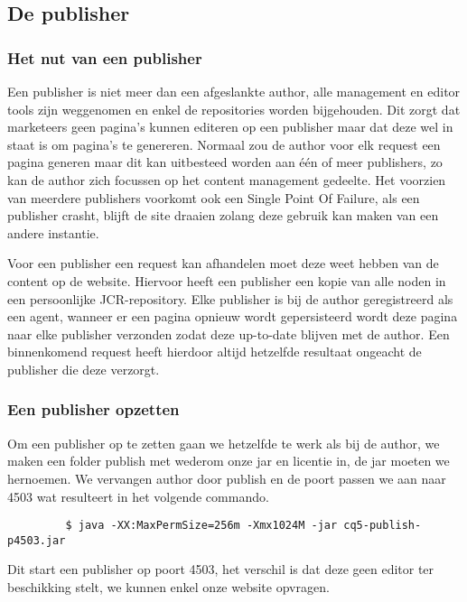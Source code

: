 
	\subsection{De publisher}
	\subsubsection{Het nut van een publisher}
	Een publisher is niet meer dan een afgeslankte author, alle management en editor tools zijn weggenomen en enkel de repositories worden bijgehouden. Dit zorgt dat marketeers geen pagina's kunnen editeren op een publisher maar dat deze wel in staat is om pagina's te genereren. Normaal zou de author voor elk request een pagina generen maar dit kan uitbesteed worden aan één of meer publishers, zo kan de author zich focussen op het content management gedeelte. Het voorzien van meerdere publishers voorkomt ook een \textquotedbl Single Point Of Failure\textquotedbl{}, als een publisher crasht, blijft de site draaien zolang deze gebruik kan maken van een andere instantie.
	\par
	Voor een publisher een request kan afhandelen moet deze weet hebben van de content op de website. Hiervoor heeft een publisher een kopie van alle noden in een persoonlijke JCR-repository. Elke publisher is bij de author geregistreerd als een agent, wanneer er een pagina opnieuw wordt gepersisteerd wordt deze pagina naar elke publisher verzonden zodat deze up-to-date blijven met de author. Een binnenkomend request heeft hierdoor altijd hetzelfde resultaat ongeacht de publisher die deze verzorgt.
	\subsubsection{Een publisher opzetten}
	Om een publisher op te zetten gaan we hetzelfde te werk als bij de author, we maken een folder \textquotedbl publish\textquotedbl{} met wederom onze jar en licentie in, de jar moeten we hernoemen. We vervangen \textquotedbl author\textquotedbl{} door \textquotedbl publish\textquotedbl{} en de poort passen we aan naar 4503 wat resulteert in het volgende commando.	
	\begin{lstlisting}
		 $ java -XX:MaxPermSize=256m -Xmx1024M -jar cq5-publish-p4503.jar
	\end{lstlisting}
	 Dit start een publisher op poort 4503, het verschil is dat deze geen editor ter beschikking stelt, we kunnen enkel onze website opvragen.
